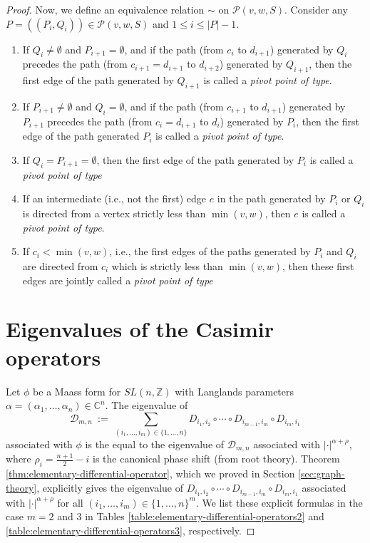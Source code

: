 \documentclass[12pt, reqno, oneside]{amsart}
\numberwithin{equation}{section}
\begin{document}
\begin{proof}
Now, we define an equivalence relation $\sim$ on $\mathcal{P}(v,w,S)$. Consider any $P = ((P_i,Q_i)) \in \mathcal{P}(v,w,S)$ and $1 \leq i \leq |P|-1$. 
\begin{enumerate}
    \item If $Q_i \neq \emptyset$ and $P_{i+1} = \emptyset$, and if the path (from $c_i$ to $d_{i+1}$) generated by $Q_i$ precedes the path (from $c_{i+1} = d_{i+1}$ to $d_{i+2}$) generated by $Q_{i+1}$, then the first edge of the path generated by $Q_{i+1}$ is called a \textit{pivot point of type}.
    \item If $P_{i+1} \neq \emptyset$ and $Q_i = \emptyset$, and if the path (from $c_{i+1}$ to $d_{i+1}$) generated by $P_{i+1}$ precedes the path (from $c_i = d_{i+1}$ to $d_i$) generated by $P_i$, then the first edge of the path generated $P_i$ is called a \textit{pivot point of type}.
    \item If $Q_i = P_{i+1} = \emptyset$, then the first edge of the path generated by $P_i$ is called a \textit{pivot point of type}
    \item If an intermediate (i.e., not the first) edge $e$ in the path generated by $P_i$ or $Q_i$ is directed from a vertex strictly less than $\min(v,w)$, then $e$ is called a \textit{pivot point of type}.
    \item If $c_i < \min(v,w)$, i.e., the first edges of the paths generated by $P_i$ and $Q_i$ are directed from $c_i$ which is strictly less than $\min(v,w)$, then these first edges are jointly called a \textit{pivot point of type} 
\end{enumerate}

%
%

\section{Eigenvalues of the Casimir operators}\label{sec:final}

Let $\phi$ be a Maass form for $SL(n,\mathbb{Z})$ with Langlands parameters $\alpha = (\alpha_1, \dots, \alpha_n) \in \mathbb{C}^n$. The eigenvalue of
\begin{equation}
\mathcal{D}_{m,n} \ := \ \sum_{(i_1,\dots,i_m) \in \{1, \dots, n\}} D_{i_1,i_2} \circ \cdots \circ D_{i_{m-1},i_m} \circ D_{i_m, i_1}
\end{equation}
associated with $\phi$ is the equal to the eigenvalue of $\mathcal{D}_{m,n}$ associated with $|\cdot|^{\alpha + \rho}$, where $\rho_i = \frac{n+1}{2} - i$ is the canonical phase shift (from root theory). Theorem \ref{thm:elementary-differential-operator}, which we proved in Section \ref{sec:graph-theory}, explicitly gives the eigenvalue of $D_{i_1,i_2} \circ \cdots \circ D_{i_{m-1},i_m} \circ D_{i_m, i_1}$ associated with $|\cdot|^{\alpha+\rho}$ for all $(i_1, \dots, i_m) \in \{1, \dots, n\}^m$. We list these explicit formulas in the case $m=2$ and $3$ in Tables \ref{table:elementary-differential-operators2} and \ref{table:elementary-differential-operators3}, respectively. 


\end{proof}
\end{document}
